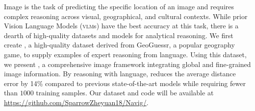 Image \geoloc is the task of predicting the specific location of an image and requires complex reasoning across visual, geographical, and cultural contexts. While prior Vision Language Models (\textsc{vlm}s) have the best accuracy at this task, there is a dearth of high-quality datasets and models for analytical reasoning.  We first create \dataname, a high-quality dataset derived from GeoGuessr, a popular geography game, to supply examples of expert reasoning from language. Using this dataset, we present \modelname, a comprehensive image \geoloc framework integrating global and fine-grained image information. By reasoning with language, \modelname reduces the average distance error by 14\% compared to previous state-of-the-art models while requiring fewer than $1000$ training samples. Our dataset and code will be available at \url{https://github.com/SparrowZheyuan18/Navig/}.